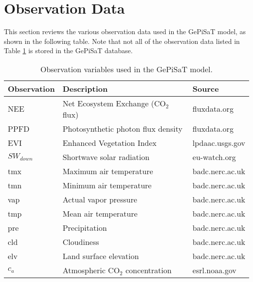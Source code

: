\section{Observation Data}
\label{sec:obsdata}
This section reviews the various observation data used in the GePiSaT model, as shown in the following table.  
Note that not all of the observation data listed in Table \ref{tab:gepisatobs} is stored in the GePiSaT database.
\begin{table}[h]
    \caption{Observation variables used in the GePiSaT model.}
    \label{tab:gepisatobs}
    \centering
    \begin{tabular}{l l l}
        \hline
        \bf{Observation} & \bf{Description} & \bf{Source} \\
        \hline
         NEE & Net Ecosystem Exchange (CO$_2$ flux) & fluxdata.org \\ 
         PPFD & Photosynthetic photon flux density & fluxdata.org \\ 
         EVI & Enhanced Vegetation Index & lpdaac.usgs.gov \\ 
         $SW_{down}$ & Shortwave solar radiation &  eu-watch.org \\
         tmx & Maximum air temperature & badc.nerc.ac.uk \\
         tmn & Minimum air temperature & badc.nerc.ac.uk \\
         vap & Actual vapor pressure & badc.nerc.ac.uk \\
         tmp & Mean air temperature & badc.nerc.ac.uk \\
         pre & Precipitation & badc.nerc.ac.uk \\
         cld & Cloudiness & badc.nerc.ac.uk \\
         elv & Land surface elevation & badc.nerc.ac.uk \\
         $c_a$ & Atmospheric CO$_2$ concentration & esrl.noaa.gov \\
        \hline
    \end{tabular}
\end{table}

